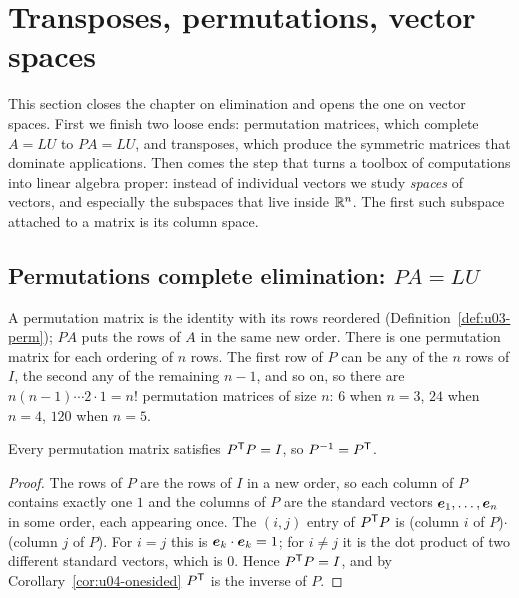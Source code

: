 \section{Transposes, permutations, vector spaces}\label{sec:u06}

This section closes the chapter on elimination and opens the one on vector spaces. First we
finish two loose ends: permutation matrices, which complete $A=LU$ to $PA=LU$, and
transposes, which produce the symmetric matrices that dominate applications. Then comes
the step that turns a toolbox of computations into linear algebra proper: instead of
individual vectors we study \emph{spaces} of vectors, and especially the subspaces that live
inside $\mathbb{R}^n$. The first such subspace attached to a matrix is its column space.

\subsection{Permutations complete elimination: \texorpdfstring{\(PA=LU\)}{PA = LU}}

A permutation matrix is the identity with its rows reordered
(Definition~\ref{def:u03-perm}); $PA$ puts the rows of $A$ in the same new order. There is
one permutation matrix for each ordering of $n$ rows. The first row of $P$ can be any of the
$n$ rows of $I$, the second any of the remaining $n-1$, and so on, so there are
$n(n-1)\cdots2\cdot1=n!$ permutation matrices of size $n$: $6$ when $n=3$, $24$ when $n=4$,
$120$ when $n=5$.

\begin{theorem}\label{thm:u06-PTP}
Every permutation matrix satisfies $P^{\mathsf{T}} P=I$, so $P^{-1}=P^{\mathsf{T}}$.
\end{theorem}

\begin{proof}
The rows of $P$ are the rows of $I$ in a new order, so each column of $P$ contains exactly
one $1$ and the columns of $P$ are the standard vectors $\boldsymbol{e}_1,\dots,\boldsymbol{e}_n$ in some
order, each appearing once. The $(i,j)$ entry of $P^{\mathsf{T}} P$ is (column $i$ of $P$)$\cdot$(column $j$
of $P$). For $i=j$ this is $\boldsymbol{e}_k\cdot\boldsymbol{e}_k=1$; for $i\neq j$ it is the dot product of two
different standard vectors, which is $0$. Hence $P^{\mathsf{T}} P=I$, and by
Corollary~\ref{cor:u04-onesided} $P^{\mathsf{T}}$ is the inverse of $P$.
\end{proof}

